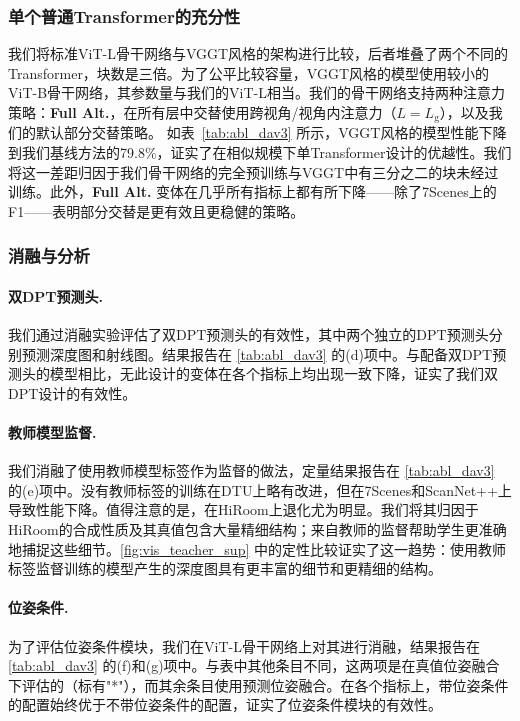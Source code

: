 {


\subsubsection{单个普通Transformer的充分性}
我们将标准ViT-L骨干网络与VGGT风格的架构进行比较，后者堆叠了两个不同的Transformer，块数是三倍。为了公平比较容量，VGGT风格的模型使用较小的ViT-B骨干网络，其参数量与我们的ViT-L相当。我们的骨干网络支持两种注意力策略：\textbf{Full Alt.}，在所有层中交替使用跨视角/视角内注意力（$L=L_\text{g}$），以及我们的默认部分交替策略。
如表~\ref{tab:abl_dav3} 所示，VGGT风格的模型性能下降到我们基线方法的79.8\%，证实了在相似规模下单Transformer设计的优越性。我们将这一差距归因于我们骨干网络的完全预训练与VGGT中有三分之二的块未经过训练。此外，\textbf{Full Alt.} 变体在几乎所有指标上都有所下降——除了7Scenes上的F1——表明部分交替是更有效且更稳健的策略。

\subsubsection{消融与分析}

\paragraph{双DPT预测头.}
我们通过消融实验评估了双DPT预测头的有效性，其中两个独立的DPT预测头分别预测深度图和射线图。结果报告在 \cref{tab:abl_dav3} 的(d)项中。与配备双DPT预测头的模型相比，无此设计的变体在各个指标上均出现一致下降，证实了我们双DPT设计的有效性。

\paragraph{教师模型监督.}
我们消融了使用教师模型标签作为监督的做法，定量结果报告在 \cref{tab:abl_dav3} 的(e)项中。没有教师标签的训练在DTU上略有改进，但在7Scenes和ScanNet++上导致性能下降。值得注意的是，在HiRoom上退化尤为明显。我们将其归因于HiRoom的合成性质及其真值包含大量精细结构；来自教师的监督帮助学生更准确地捕捉这些细节。\cref{fig:vis_teacher_sup} 中的定性比较证实了这一趋势：使用教师标签监督训练的模型产生的深度图具有更丰富的细节和更精细的结构。

\paragraph{位姿条件.}
为了评估位姿条件模块，我们在ViT-L骨干网络上对其进行消融，结果报告在 \cref{tab:abl_dav3} 的(f)和(g)项中。与表中其他条目不同，这两项是在真值位姿融合下评估的（标有"*"），而其余条目使用预测位姿融合。在各个指标上，带位姿条件的配置始终优于不带位姿条件的配置，证实了位姿条件模块的有效性。

}
